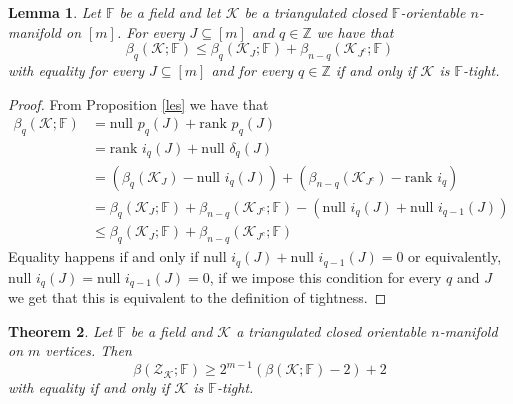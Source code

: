\documentclass[a4paper]{amsart}
\newtheorem{thm}{Theorem}[section]
\newtheorem{lem}[thm]{Lemma}
\theoremstyle{definition}
\def\Z{\mathbb{Z}}    %
\def\K{\mathcal{K}}
\def\ZZ{\mathcal{Z}}
\def\Z{\mathbb{Z}}
\def\F{\mathbb{F}}
\def\rank{\text{rank }}
\def\J{{J^c}}
\begin{document}
\begin{lem}\label{main}
    Let $\F$ be a field and let $\K$ be a triangulated closed $\F$-orientable $n$-manifold on $[m]$. For every $J\subseteq [m]$ and $q\in \Z$ we have that 
    \[\beta_q(\K;\F)\leq \beta_q(\K_{J};\F)+ \beta_{n-q}(\K_{{J^c}};\F)\]
    with equality for every $J\subseteq [m]$ and for every $q\in\Z$ if and only if $\K$ is $\F$-tight. 
\end{lem}
\begin{proof}
    From Proposition \ref{les} we have that 
    \begin{align*}
        \beta_q(\K;\F)&=\text{null }p_q(J) +\rank p_q(J)\\
                   &=\rank i_q(J)+\text{null } \delta_q(J)\\
                   &=\left(\beta_q(\K_J)-\text{null }i_q(J)\right)+\left(\beta_{n-q}(\K_\J)-\rank i_q\right)\\
                   &=\beta_q(\K_J;\F)+\beta_{n-q}(\K_\J;\F)-(\text{null }i_q(J)+\text{null }i_{q-1}(J))\\
                   &\leq \beta_q(\K_J;\F)+\beta_{n-q}(\K_{\J};\F)
    \end{align*} 
    Equality happens if and only if $\text{null }i_q(J)+\text{null }i_{q-1}(J)=0$ or equivalently, $\text{null }i_q(J)=\text{null }i_{q-1}(J)=0$, if we impose this condition for every $q$ and $J$ we get that this is equivalent to the definition of tightness.
\end{proof}
\begin{thm}\label{truemain}
    Let $\F$ be a field and $\K$ a triangulated closed orientable $n$-manifold on $m$ vertices. Then
    \[\beta(\ZZ_\K;\F)\geq2^{m-1}(\beta(\K;\F)-2)+2\]
    with equality if and only if $\K$ is $\F$-tight.
\end{thm}
\end{document}
